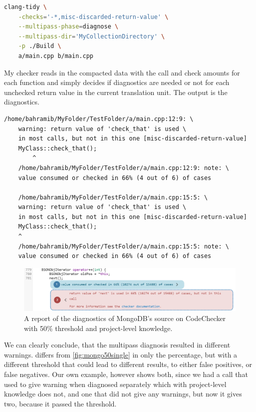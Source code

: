 \begin{lstlisting}[language={bash}]
	clang-tidy \
	-checks='-*,misc-discarded-return-value' \
	--multipass-phase=diagnose \
	--multipass-dir='MyCollectionDirectory' \
	-p ./Build \
	a/main.cpp b/main.cpp
\end{lstlisting}

My checker reads in the compacted data with the call and check amounts for each function and simply decides
if diagnostics are needed or not for each unchecked return value in the current translation unit.
The output is the diagnostics.

\begin{lstlisting}[caption={Diagnostic output with project-level knowledge.},captionpos=b]
	/home/bahramib/MyFolder/TestFolder/a/main.cpp:12:9: \
	warning: return value of 'check_that' is used \
	in most calls, but not in this one [misc-discarded-return-value]
	MyClass::check_that();
		^
	/home/bahramib/MyFolder/TestFolder/a/main.cpp:12:9: note: \
	value consumed or checked in 66% (4 out of 6) of cases

	/home/bahramib/MyFolder/TestFolder/a/main.cpp:15:5: \
	warning: return value of 'check_that' is used \
	in most calls, but not in this one [misc-discarded-return-value]
	MyClass::check_that();
	^
	/home/bahramib/MyFolder/TestFolder/a/main.cpp:15:5: note: \
	value consumed or checked in 66% (4 out of 6) of cases
\end{lstlisting}



\begin{figure}[H]
	\includegraphics[width=\linewidth]{images/codechecker_first_ss_mongo_multi_50.png}
	\caption{A report of the diagnostics of MongoDB's source on CodeChecker with 50\% threshold and project-level knowledge.}
	\label{fig:mongo50multi}
\end{figure}

We can clearly conclude, that the multipass diagnosis resulted in different warnings. 
differs from \cref{fig:mongo50single} in only the percentage, but with a different threshold that could lead to different
results, to either false positives, or false negatives. Our own example, however shows both, since we had a call
that used to give warning when diagnosed separately which with project-level knowledge does not, and one that did not give
any warnings, but now it gives two, because it passed the threshold.


